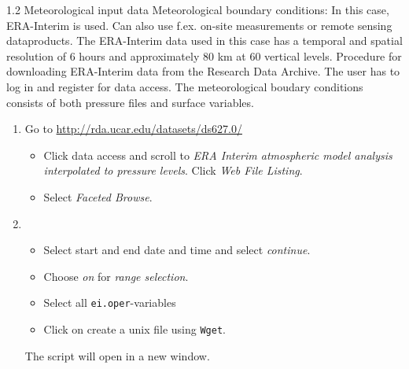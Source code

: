 \documentclass[xcolor=table]{beamer}
\begin{document}
\begin{frame}[fragile, allowframebreaks=1, t]{1.2 Meteorological input data}
Meteorological boundary conditions: In this case, ERA-Interim is used. Can also use f.ex. on-site measurements or remote sensing dataproducts. The ERA-Interim data used in this case has a temporal and spatial resolution of 6 hours and approximately 80 km at 60 vertical levels. 
Procedure for downloading ERA-Interim data from the Research Data Archive. The user has to log in and register for data access. 
The meteorological boudary conditions consists of both pressure files and surface variables. 
\begin{enumerate}
	\item Go to \url{http://rda.ucar.edu/datasets/ds627.0/}
	\begin{itemize}
		\item Click data access and scroll to \textit{ERA Interim atmospheric model analysis interpolated to pressure levels}. Click \textit{Web File Listing}.
		\item Select \textit{Faceted Browse}.
	\end{itemize}
	\item
	\begin{itemize}
		\item  Select start and end date and time and select \textit{continue}.
		\item Choose \textit{on} for \textit{range selection}.
		\item Select all \texttt{ei.oper}-variables
		\item Click on create a unix file using \texttt{Wget}. 
	\end{itemize}
	The script will open in a new window.


\end{enumerate}
\end{frame}
\end{document}
